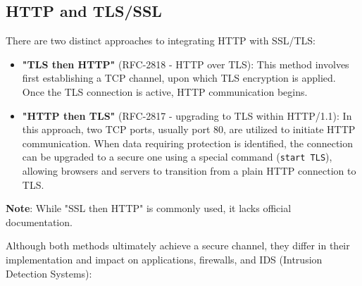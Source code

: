 \subsection{HTTP and TLS/SSL}

There are two distinct approaches to integrating HTTP with SSL/TLS:
\begin{itemize}
    \item \textbf{"TLS then HTTP"} (RFC-2818 - HTTP over TLS): This method involves first establishing a TCP channel, upon which TLS encryption is applied. Once the TLS connection is active, HTTP communication begins.
    
    \item \textbf{"HTTP then TLS"} (RFC-2817 - upgrading to TLS within HTTP/1.1): In this approach, two TCP ports, usually port 80, are utilized to initiate HTTP communication. When data requiring protection is identified, the connection can be upgraded to a secure one using a special command (\texttt{start TLS}), allowing browsers and servers to transition from a plain HTTP connection to TLS.
\end{itemize}
\textbf{Note}: While "SSL then HTTP" is commonly used, it lacks official documentation.


Although both methods ultimately achieve a secure channel, they differ in their implementation and impact on applications, firewalls, and IDS (Intrusion Detection Systems):

